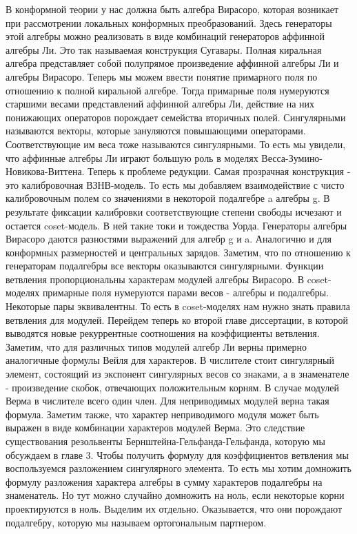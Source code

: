 \documentclass{article}
\begin{document}
В конформной теории у нас должна быть алгебра Вирасоро, которая возникает при рассмотрении локальных конформных преобразований. Здесь генераторы этой алгебры можно реализовать в виде комбинаций генераторов аффинной алгебры Ли. Это так называемая конструкция Сугавары. 
Полная киральная алгебра представляет собой полупрямое произведение аффинной алгебры Ли и алгебры Вирасоро. 
Теперь мы можем ввести понятие примарного поля по отношению к полной киральной алгебре. Тогда примарные поля нумеруются старшими весами представлений аффинной алгебры Ли, действие на них понижающих операторов порождает семейства вторичных полей. 
Сингулярными называются векторы, которые зануляются повышающими операторами. Соответствующие им веса тоже называются сингулярными. 
То есть мы увидели, что аффинные алгебры Ли играют большую роль в моделях Весса-Зумино-Новикова-Виттена. 
Теперь к проблеме редукции. Самая прозрачная конструкция - это калибровочная ВЗНВ-модель. То есть мы добавляем взаимодействие с чисто калибровочным полем со значениями в некоторой подалгебре a алгебры g. В результате фиксации калибровки соответствующие степени свободы исчезают и остается coset-модель. 
В ней такие токи и тождества Уорда. Генераторы алгебры Вирасоро даются разностями выражений для алгебр g и a. Аналогично и для конформных размерностей и центральных зарядов. 
Заметим, что по отношению к генераторам подалгебры все векторы оказываются сингулярными. Функции ветвления пропорциональны характерам модулей алгебры Вирасоро. В coset-моделях примарные поля нумеруются парами весов - алгебры и подалгебры. Некоторые пары эквивалентны. То есть в coset-моделях нам нужно знать правила ветвления для модулей. 
Перейдем теперь ко второй главе диссертации, в которой выводятся новые рекуррентные соотношения на коэффициенты ветвления. Заметим, что для различных типов модулей алгебр Ли верны примерно аналогичные формулы Вейля для характеров. В числителе стоит сингулярный элемент, состоящий из экспонент сингулярных весов со знаками, а в знаменателе - произведение скобок, отвечающих положительным корням. В случае модулей Верма в числителе всего один член. Для неприводимых модулей верна такая формула. Заметим также, что характер неприводимого модуля может быть выражен в виде комбинации характеров модулей Верма. Это следствие существования резольвенты Бернштейна-Гельфанда-Гельфанда, которую мы обсуждаем в главе 3. 
Чтобы получить формулу для коэффициентов ветвления мы воспользуемся разложением сингулярного элемента. То есть мы хотим домножить формулу разложения характера алгебры в сумму характеров подалгебры на знаменатель. Но тут можно случайно домножить на ноль, если некоторые корни проектируются в ноль. Выделим их отдельно. Оказывается, что они порождают подалгебру, которую мы называем ортогональным партнером. 
\end{document}
